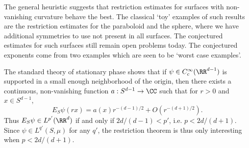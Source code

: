 The general heuristic suggests that restriction estimates for surfaces with non-vanishing curvature behave the best. The classical `toy' examples of such results are the restriction estimates for the paraboloid and the sphere, where we have additional symmetries to use not present in all surfaces. The conjectured estimates for such surfaces still remain open problems today. The conjectured exponents come from two examples which are seen to be `worst case examples'.

The standard theory of stationary phase shows that if $\psi \in C_c^\infty(\RR^{d-1})$ is supported in a small enough neighborhood of the origin, then there exists a continuous, non-vanishing function $a: S^{d-1} \to \CC$ such that for $r > 0$ and $x \in S^{d-1}$,
%
\[ E_S \psi(rx) = a(x) r^{-(d-1)/2} + O(r^{-(d+1)/2}). \]
%
Thus $E_S \psi \in L^{p'}(\RR^d)$ if and only if $2d/(d-1) < p'$, i.e. $p < 2d/(d+1)$. Since $\psi \in L^{q'}(S,\mu)$ for any $q'$, the restriction theorem is thus only interesting when $p < 2d/(d+1)$.

